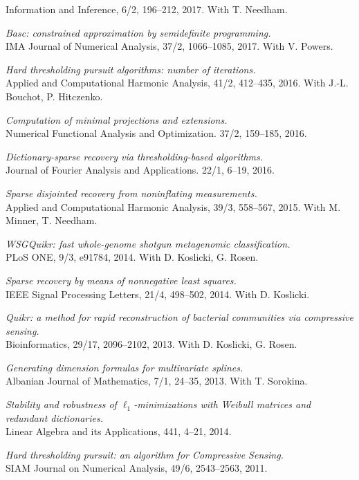 \documentclass[11pt]{article}
\begin{document}
Information and Inference, 6/2, 196--212, 2017.
With T. Needham.
\item{\sl {\sf Basc}: constrained approximation by semidefinite programming.}\\
IMA Journal of Numerical Analysis, 37/2, 1066--1085, 2017.
With V. Powers.
\item {\sl Hard thresholding pursuit algorithms: number of iterations.}\\
Applied and Computational Harmonic Analysis, 
41/2, 412--435, 2016.
With J.-L. Bouchot, P. Hitczenko. 
\item {\sl Computation of minimal projections and extensions.}\\
Numerical Functional Analysis and Optimization. 37/2, 159--185, 2016.
\item {\sl Dictionary-sparse recovery via thresholding-based algorithms.}\\ 
Journal of Fourier Analysis and Applications. 22/1, 6--19, 2016.
\item {\sl Sparse disjointed recovery from noninflating measurements.}\\
Applied and Computational Harmonic Analysis, 39/3, 558--567, 2015.
With M. Minner, T. Needham.
\item {\sl WSGQuikr: fast whole-genome shotgun metagenomic classification.}\\
PLoS ONE, 9/3, e91784, 2014. 
With D. Koslicki, G. Rosen.
\item{\sl Sparse recovery by means of nonnegative least squares.}\\
IEEE Signal Processing Letters, 21/4, 498--502, 2014. 
With D. Koslicki.
\item {\sl Quikr: a method for rapid reconstruction of bacterial communities via compressive sensing.}\\
Bioinformatics, 29/17, 2096--2102, 2013. 
With D. Koslicki, G. Rosen.
\item {\sl Generating dimension formulas for multivariate splines.}\\
Albanian Journal of Mathematics, 7/1, 24--35, 2013.
 With T. Sorokina.
\item {\sl Stability and robustness of $\ell_1$-minimizations with Weibull matrices and redundant dictionaries.}\\
Linear Algebra and its Applications, 441, 4--21, 2014.
\item {\sl Hard thresholding pursuit: an algorithm for Compressive Sensing.}\\
SIAM Journal on Numerical Analysis, 49/6, 2543--2563, 2011.
\end{document}
